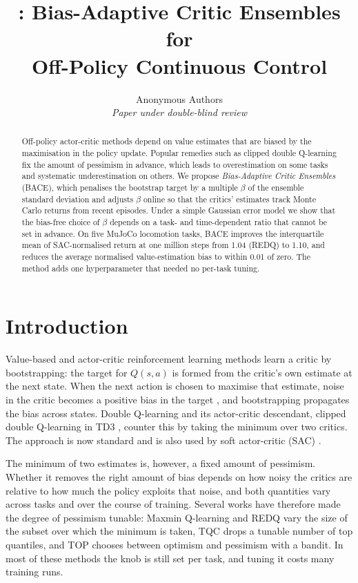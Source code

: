 \documentclass[10pt,twocolumn,letterpaper]{article}
\title{\method: Bias-Adaptive Critic Ensembles for\\Off-Policy Continuous Control}
\author{Anonymous Authors\\ \textit{Paper under double-blind review}}
\date{}
\newcommand{\method}{\textsc{BACE}}
\begin{document}
\maketitle

\begin{abstract}
Off-policy actor-critic methods depend on value estimates that are biased by the maximisation in the policy update. Popular remedies such as clipped double Q-learning fix the amount of pessimism in advance, which leads to overestimation on some tasks and systematic underestimation on others. We propose \emph{Bias-Adaptive Critic Ensembles} (\method), which penalises the bootstrap target by a multiple $\beta$ of the ensemble standard deviation and adjusts $\beta$ online so that the critics' estimates track Monte Carlo returns from recent episodes. Under a simple Gaussian error model we show that the bias-free choice of $\beta$ depends on a task- and time-dependent ratio that cannot be set in advance. On five MuJoCo locomotion tasks, \method{} improves the interquartile mean of SAC-normalised return at one million steps from 1.04 (REDQ) to 1.10, and reduces the average normalised value-estimation bias to within 0.01 of zero. The method adds one hyperparameter that needed no per-task tuning.
\end{abstract}

\section{Introduction}
\label{sec:intro}

Value-based and actor-critic reinforcement learning methods \citep{mnih2015,haarnoja2018} learn a critic by bootstrapping: the target for $Q(s,a)$ is formed from the critic's own estimate at the next state. When the next action is chosen to maximise that estimate, noise in the critic becomes a positive bias in the target \citep{thrun1993}, and bootstrapping propagates the bias across states. Double Q-learning \citep{vanhasselt2010,vanhasselt2016} and its actor-critic descendant, clipped double Q-learning in TD3 \citep{fujimoto2018}, counter this by taking the minimum over two critics. The approach is now standard and is also used by soft actor-critic (SAC) \citep{haarnoja2018,haarnoja2018apps}.

The minimum of two estimates is, however, a fixed amount of pessimism. Whether it removes the right amount of bias depends on how noisy the critics are relative to how much the policy exploits that noise, and both quantities vary across tasks and over the course of training. Several works have therefore made the degree of pessimism tunable: Maxmin Q-learning \citep{lan2020} and REDQ \citep{chen2021} vary the size of the subset over which the minimum is taken, TQC \citep{kuznetsov2020} drops a tunable number of top quantiles, and TOP \citep{moskovitz2021} chooses between optimism and pessimism with a bandit. In most of these methods the knob is still set per task, and tuning it costs many training runs.
\end{document}
